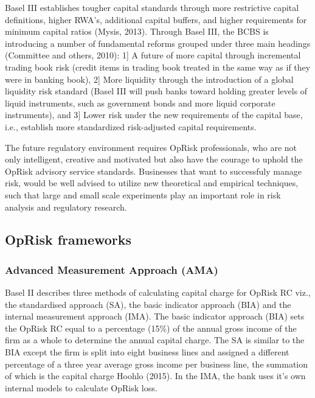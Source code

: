 \documentclass[]{DissertateUSU}
\begin{document}
Basel III establishes tougher capital standards through more restrictive
capital definitions, higher RWA's, additional capital buffers, and
higher requirements for minimum capital ratios (Mysis, 2013). Through
Basel III, the BCBS is introducing a number of fundamental reforms
grouped under three main headings (Committee and others, 2010): 1{]} A
future of more capital through incremental trading book risk (credit
items in trading book treated in the same way as if they were in banking
book), 2{]} More liquidity through the introduction of a global
liquidity risk standard (Basel III will push banks toward holding
greater levels of liquid instruments, such as government bonds and more
liquid corporate instruments), and 3{]} Lower risk under the new
requirements of the capital base, i.e., establish more standardized
risk-adjusted capital requirements.\medskip

The future regulatory environment requires OpRisk professionals, who are
not only intelligent, creative and motivated but also have the courage
to uphold the OpRisk advisory service standards. Businesses that want to
successfuly manage risk, would be well advised to utilize new
theoretical and empirical techniques, such that large and small scale
experiments play an important role in risk analysis and regulatory
research.

\subsection{OpRisk frameworks}

\subsubsection{Advanced Measurement Approach (AMA)}

Basel II describes three methods of calculating capital charge for
OpRisk RC viz., the standardised approach (SA), the basic indicator
approach (BIA) and the internal measurement approach (IMA). The basic
indicator approach (BIA) sets the OpRisk RC equal to a percentage (15\%)
of the annual gross income of the firm as a whole to determine the
annual capital charge. The SA is similar to the BIA except the firm is
split into eight business lines and assigned a different percentage of a
three year average gross income per business line, the summation of
which is the capital charge Hoohlo (2015). In the IMA, the bank uses
it's own internal models to calculate OpRisk loss.\medskip
\end{document}
